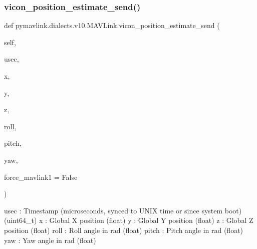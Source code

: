 \begin{DoxyVerb}
\begin{DoxyVerb}
\begin{DoxyVerb}
\begin{DoxyVerb}
\begin{DoxyVerb}
\begin{DoxyVerb}
\begin{DoxyVerb}
\begin{DoxyVerb}
\begin{DoxyVerb}
\begin{DoxyVerb}
\subsubsection{\texorpdfstring{vicon\+\_\+position\+\_\+estimate\+\_\+send()}{vicon\_position\_estimate\_send()}}
{\footnotesize\ttfamily def pymavlink.\+dialects.\+v10.\+M\+A\+V\+Link.\+vicon\+\_\+position\+\_\+estimate\+\_\+send (\begin{DoxyParamCaption}\item[{}]{self,  }\item[{}]{usec,  }\item[{}]{x,  }\item[{}]{y,  }\item[{}]{z,  }\item[{}]{roll,  }\item[{}]{pitch,  }\item[{}]{yaw,  }\item[{}]{force\+\_\+mavlink1 = {\ttfamily False} }\end{DoxyParamCaption})}

\begin{DoxyVerb}usec                      : Timestamp (microseconds, synced to UNIX time or since system boot) (uint64_t)
x                         : Global X position (float)
y                         : Global Y position (float)
z                         : Global Z position (float)
roll                      : Roll angle in rad (float)
pitch                     : Pitch angle in rad (float)
yaw                       : Yaw angle in rad (float)\end{DoxyVerb}
 \mbox{\label{classpymavlink_1_1dialects_1_1v10_1_1MAVLink_a4b199d999057acaec04ff881343a4b92}} 

\end{DoxyVerb}
\end{DoxyVerb}
\end{DoxyVerb}
\end{DoxyVerb}
\end{DoxyVerb}
\end{DoxyVerb}
\end{DoxyVerb}
\end{DoxyVerb}
\end{DoxyVerb}
\end{DoxyVerb}
